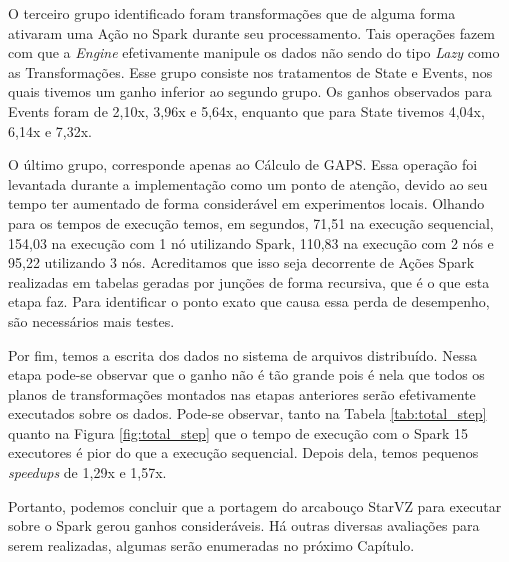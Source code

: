 O terceiro grupo identificado foram transformações que de alguma forma ativaram 
uma Ação no Spark durante seu processamento. Tais operações fazem com que a 
\emph{Engine} efetivamente manipule os dados \cite{ref:sparkbook} não sendo do 
tipo \emph{Lazy} como as Transformações. Esse grupo consiste nos tratamentos de 
State e Events, nos quais tivemos um ganho inferior ao segundo grupo. Os ganhos 
observados para Events foram de 2,10x, 3,96x e 5,64x, enquanto que para State 
tivemos 4,04x, 6,14x e 7,32x.

O último grupo, corresponde apenas ao Cálculo de GAPS. Essa operação foi 
levantada durante a implementação como um ponto de atenção, devido ao seu tempo 
ter aumentado de forma considerável em experimentos locais. Olhando para os 
tempos de execução temos, em segundos, 71,51 na execução sequencial, 154,03 na 
execução com 1 nó utilizando Spark, 110,83 na execução com 2 nós e 95,22 
utilizando 3 nós. Acreditamos que isso seja decorrente de Ações Spark 
realizadas em tabelas geradas por junções de forma recursiva, que é o que esta 
etapa faz. Para identificar o ponto exato que causa essa perda de desempenho, 
são necessários mais testes.

Por fim, temos a escrita dos dados no sistema de arquivos distribuído. Nessa 
etapa pode-se observar que o ganho não é tão grande pois é nela que todos os 
planos de transformações montados nas etapas anteriores serão efetivamente 
executados sobre os dados. Pode-se observar, tanto na Tabela 
\ref{tab:total_step} quanto na Figura \ref{fig:total_step} que o tempo de 
execução com o Spark 15 executores é pior do que a execução sequencial. Depois 
dela, temos pequenos \emph{speedups} de 1,29x e 1,57x.

Portanto, podemos concluir que a portagem do arcabouço StarVZ para executar 
sobre o Spark gerou ganhos consideráveis. Há outras diversas avaliações para 
serem realizadas, algumas serão enumeradas no próximo Capítulo.



